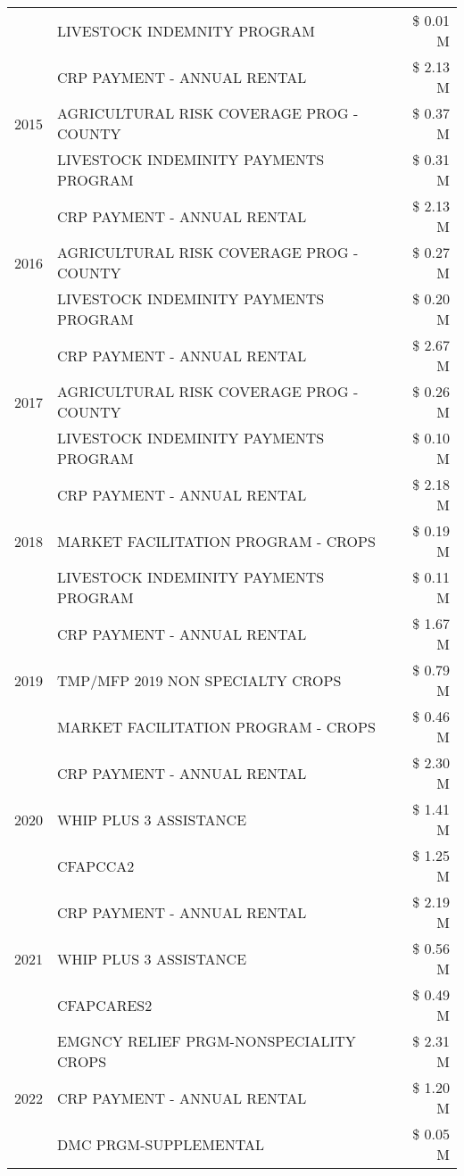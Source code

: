 \begin{tabular}{llr}
 & LIVESTOCK INDEMNITY PROGRAM & \$ 0.01 M \\
\cline{1-3}
\multirow[t]{3}{*}{2015} & CRP PAYMENT - ANNUAL RENTAL & \$ 2.13 M \\
 & AGRICULTURAL RISK COVERAGE PROG - COUNTY & \$ 0.37 M \\
 & LIVESTOCK INDEMINITY PAYMENTS PROGRAM & \$ 0.31 M \\
\cline{1-3}
\multirow[t]{3}{*}{2016} & CRP PAYMENT - ANNUAL RENTAL & \$ 2.13 M \\
 & AGRICULTURAL RISK COVERAGE PROG - COUNTY & \$ 0.27 M \\
 & LIVESTOCK INDEMINITY PAYMENTS PROGRAM & \$ 0.20 M \\
\cline{1-3}
\multirow[t]{3}{*}{2017} & CRP PAYMENT - ANNUAL RENTAL & \$ 2.67 M \\
 & AGRICULTURAL RISK COVERAGE PROG - COUNTY & \$ 0.26 M \\
 & LIVESTOCK INDEMINITY PAYMENTS PROGRAM & \$ 0.10 M \\
\cline{1-3}
\multirow[t]{3}{*}{2018} & CRP PAYMENT - ANNUAL RENTAL & \$ 2.18 M \\
 & MARKET FACILITATION PROGRAM - CROPS & \$ 0.19 M \\
 & LIVESTOCK INDEMINITY PAYMENTS PROGRAM & \$ 0.11 M \\
\cline{1-3}
\multirow[t]{3}{*}{2019} & CRP PAYMENT - ANNUAL RENTAL & \$ 1.67 M \\
 & TMP/MFP 2019 NON SPECIALTY CROPS & \$ 0.79 M \\
 & MARKET FACILITATION PROGRAM - CROPS & \$ 0.46 M \\
\cline{1-3}
\multirow[t]{3}{*}{2020} & CRP PAYMENT - ANNUAL RENTAL & \$ 2.30 M \\
 & WHIP PLUS 3 ASSISTANCE & \$ 1.41 M \\
 & CFAPCCA2 & \$ 1.25 M \\
\cline{1-3}
\multirow[t]{3}{*}{2021} & CRP PAYMENT - ANNUAL RENTAL & \$ 2.19 M \\
 & WHIP PLUS 3 ASSISTANCE & \$ 0.56 M \\
 & CFAPCARES2 & \$ 0.49 M \\
\cline{1-3}
\multirow[t]{3}{*}{2022} & EMGNCY RELIEF PRGM-NONSPECIALITY CROPS & \$ 2.31 M \\
 & CRP PAYMENT - ANNUAL RENTAL & \$ 1.20 M \\
 & DMC PRGM-SUPPLEMENTAL & \$ 0.05 M \\
\cline{1-3}
\bottomrule
\end{tabular}
